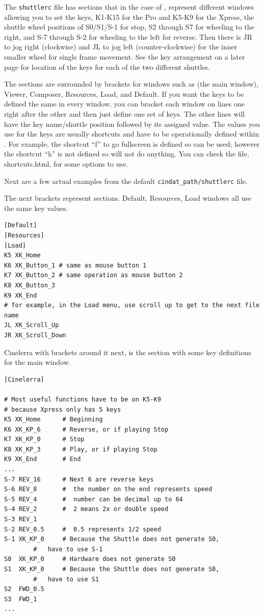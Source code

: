 The \texttt{shuttlerc} file has sections that in the case of \CGG{},
represent different windows allowing you to set the keys, K1-K15 for
the Pro and K5-K9 for the Xpress, the shuttle wheel positions of
S0/S1/S-1 for stop, S2 through S7 for wheeling to the right, and S-7
through S-2 for wheeling to the left for reverse.  Then there is JR
to jog right (clockwise) and JL to jog left (counter-clockwise) for
the inner smaller wheel for single frame movement.  See the key
arrangement on a later page for location of the keys for each of the
two different shuttles.

The sections are surrounded by brackets for windows such as \CGG{}
(the main window), Viewer, Composer, Resources, Load, and Default.
If you want the keys to be defined the same in every window, you can
bracket each window on lines one right after the other and then just
define one set of keys.  The other lines will have the key
name/shuttle position followed by its assigned value.  The values
you use for the keys are usually shortcuts and have to be
operationally defined within \CGG{}. For example, the shortcut “f”
to go fullscreen is defined so can be used; however the shortcut “h”
is not defined so will not do anything.  You can check the file,
shortcuts.html, for some options to use.

Next are a few actual examples from the default
\texttt{{cindat\_path}/shuttlerc} file.

The next brackets represent sections. Default, Resources, Load
windows all use the same key values.

\begin{lstlisting}[style=sh]
[Default]
[Resources]
[Load]
K5 XK_Home
K6 XK_Button_1 # same as mouse button 1
K7 XK_Button_2 # same operation as mouse button 2
K8 XK_Button_3
K9 XK_End
# for example, in the Load menu, use scroll up to get to the next file name
JL XK_Scroll_Up
JR XK_Scroll_Down
\end{lstlisting}

Cinelerra with brackets around it next, is the section with some key
definitions for the main window.

\begin{lstlisting}[style=sh]
[Cinelerra]

# Most useful functions have to be on K5-K9
# because Xpress only has 5 keys
K5 XK_Home      # Beginning
K6 XK_KP_6      # Reverse, or if playing Stop
K7 XK_KP_0      # Stop
K8 XK_KP_3      # Play, or if playing Stop
K9 XK_End       # End
...
S-7 REV_16     	# Next 6 are reverse keys
S-6 REV_8      	#  the number on the end represents speed
S-5 REV_4      	#  number can be decimal up to 64
S-4 REV_2      	#  2 means 2x or double speed
S-3 REV_1
S-2 REV_0.5    	#  0.5 represents 1/2 speed
S-1 XK_KP_0    	# Because the Shuttle does not generate S0,
		#   have to use S-1
S0  XK_KP_0   	# Hardware does not generate S0
S1  XK_KP_0   	# Because the Shuttle does not generate S0,
		#   have to use S1
S2  FWD_0.5
S3  FWD_1
...
\end{lstlisting}

